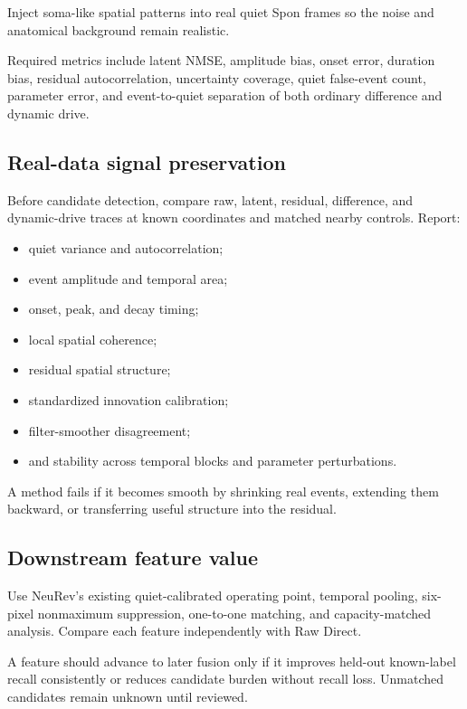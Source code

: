 \documentclass[11pt]{article}
\begin{document}
Inject soma-like spatial patterns into real quiet Spon frames so the noise and
anatomical background remain realistic.

Required metrics include latent NMSE, amplitude bias, onset error, duration
bias, residual autocorrelation, uncertainty coverage, quiet false-event count,
parameter error, and event-to-quiet separation of both ordinary difference and
dynamic drive.

\subsection{Real-data signal preservation}

Before candidate detection, compare raw, latent, residual, difference, and
dynamic-drive traces at known coordinates and matched nearby controls. Report:

\begin{itemize}[leftmargin=*]
\item quiet variance and autocorrelation;
\item event amplitude and temporal area;
\item onset, peak, and decay timing;
\item local spatial coherence;
\item residual spatial structure;
\item standardized innovation calibration;
\item filter-smoother disagreement;
\item and stability across temporal blocks and parameter perturbations.
\end{itemize}

A method fails if it becomes smooth by shrinking real events, extending them
backward, or transferring useful structure into the residual.

\subsection{Downstream feature value}

Use NeuRev's existing quiet-calibrated operating point, temporal pooling,
six-pixel nonmaximum suppression, one-to-one matching, and capacity-matched
analysis. Compare each feature independently with Raw Direct.

A feature should advance to later fusion only if it improves held-out
known-label recall consistently or reduces candidate burden without recall
loss. Unmatched candidates remain unknown until reviewed.
\end{document}
